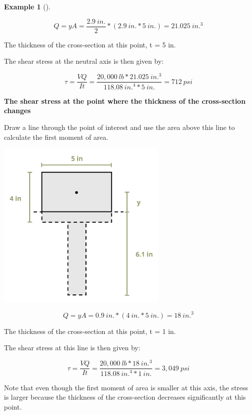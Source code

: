 \documentclass[
  letterpaper,
  DIV=11,
  numbers=noendperiod]{scrreprt}
\theoremstyle{definition}
\newtheorem{example}{Example}[chapter]
\theoremstyle{remark}
\begin{document}
\begin{tcolorbox}
\begin{example}[]
\begin{tcolorbox}
\[
Q=y A=\frac{2.9{~in.}}{2} *(2.9{~in.} * 5{~in.})=21.025{~in.}^3
\]

The thickness of the cross-section at this point, t = 5 in.

The shear stress at the neutral axis is then given by:

\[
\tau=\frac{V Q}{I t}=\frac{20,000{~lb} * 21.025{~in.}^3}{118.08{~in.}^4 * 5{~in.}}=712{~psi}
\]

\textbf{The shear stress at the point where the thickness of the
cross-section changes}

Draw a line through the point of interest and use the area above this
line to calculate the first moment of area.

\begin{center}
\includegraphics[width=3.25in,height=\textheight]{images/CH10 PNGs/example 10.4 part 4.png}
\end{center}

\[
Q=y A=0.9{~in.} *(4 {~in.}* 5{~in.})=18{~in.}^3
\]

The thickness of the cross-section at this point, t = 1 in.

The shear stress at this line is then given by:

\[
\tau=\frac{V Q}{I t}=\frac{20,000 {~lb}* 18{~in.}^3}{118.08{~in.}^4 * 1{~in.}}=3,049{~psi}
\]

Note that even though the first moment of area is smaller at this axis,
the stress is larger because the thickness of the cross-section
decreases significantly at this point.

\end{tcolorbox}

\end{example}

\end{tcolorbox}
\end{document}
